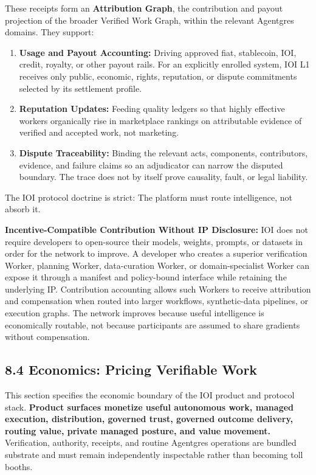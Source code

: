 \documentclass[
  11pt,
]{article}
\providecommand{\tightlist}{%
  \setlength{\itemsep}{0pt}\setlength{\parskip}{0pt}}
\begin{document}
These receipts form an \textbf{Attribution Graph}, the contribution and
payout projection of the broader Verified Work Graph, within the relevant
Agentgres domains. They support:

\begin{enumerate}
\def\labelenumi{\arabic{enumi}.}
\tightlist
\item
  \textbf{Usage and Payout Accounting:} Driving approved fiat,
  stablecoin, IOI, credit, royalty, or other payout rails. For an explicitly
  enrolled system, IOI L1 receives only public, economic, rights, reputation,
  or dispute commitments selected by its settlement profile.
\item
  \textbf{Reputation Updates:} Feeding quality ledgers so that highly
  effective workers organically rise in marketplace rankings on
  attributable evidence of verified and accepted work, not marketing.
\item
  \textbf{Dispute Traceability:} Binding the relevant acts, components,
  contributors, evidence, and failure claims so an adjudicator can narrow the
  disputed boundary. The trace does not by itself prove causality, fault, or
  legal liability.
\end{enumerate}

The IOI protocol doctrine is strict: The platform must route
intelligence, not absorb it.

\textbf{Incentive-Compatible Contribution Without IP Disclosure:} IOI
does not require developers to open-source their models, weights,
prompts, or datasets in order for the network to improve. A developer
who creates a superior verification Worker, planning Worker,
data-curation Worker, or domain-specialist Worker can expose it through
a manifest and policy-bound interface while retaining the underlying IP.
Contribution accounting allows such Workers to receive attribution and
compensation when routed into larger workflows, synthetic-data
pipelines, or execution graphs. The network improves because useful
intelligence is economically routable, not because participants are
assumed to share gradients without compensation.

\hypertarget{economics-pricing-verifiable-work}{%
\subsection{8.4 Economics: Pricing Verifiable
Work}\label{economics-pricing-verifiable-work}}

This section specifies the economic boundary of the IOI product and
protocol stack. \textbf{Product surfaces monetize useful autonomous work,
managed execution, distribution, governed trust, governed outcome delivery,
routing value, private managed posture, and value movement.} Verification,
authority, receipts, and routine Agentgres operations are bundled substrate
and must remain independently inspectable rather than becoming toll booths.
\end{document}

